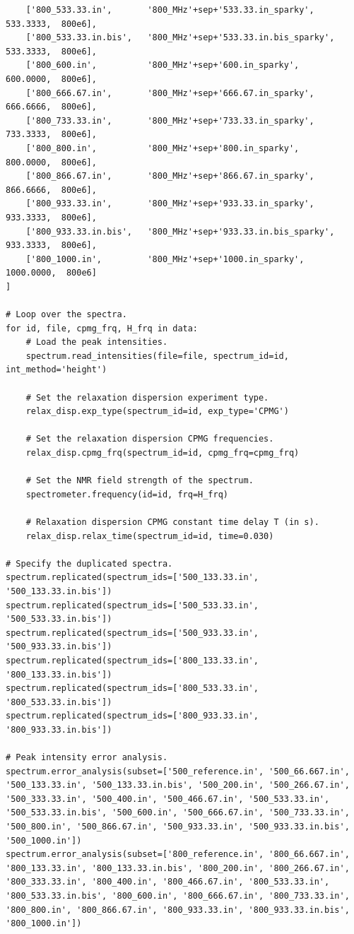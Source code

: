 \begin{lstlisting}
    ['800_533.33.in',       '800_MHz'+sep+'533.33.in_sparky',          533.3333,  800e6],
    ['800_533.33.in.bis',   '800_MHz'+sep+'533.33.in.bis_sparky',      533.3333,  800e6],
    ['800_600.in',          '800_MHz'+sep+'600.in_sparky',             600.0000,  800e6],
    ['800_666.67.in',       '800_MHz'+sep+'666.67.in_sparky',          666.6666,  800e6],
    ['800_733.33.in',       '800_MHz'+sep+'733.33.in_sparky',          733.3333,  800e6],
    ['800_800.in',          '800_MHz'+sep+'800.in_sparky',             800.0000,  800e6],
    ['800_866.67.in',       '800_MHz'+sep+'866.67.in_sparky',          866.6666,  800e6],
    ['800_933.33.in',       '800_MHz'+sep+'933.33.in_sparky',          933.3333,  800e6],
    ['800_933.33.in.bis',   '800_MHz'+sep+'933.33.in.bis_sparky',      933.3333,  800e6],
    ['800_1000.in',         '800_MHz'+sep+'1000.in_sparky',           1000.0000,  800e6]
]

# Loop over the spectra.
for id, file, cpmg_frq, H_frq in data:
    # Load the peak intensities.
    spectrum.read_intensities(file=file, spectrum_id=id, int_method='height')

    # Set the relaxation dispersion experiment type.
    relax_disp.exp_type(spectrum_id=id, exp_type='CPMG')

    # Set the relaxation dispersion CPMG frequencies.
    relax_disp.cpmg_frq(spectrum_id=id, cpmg_frq=cpmg_frq)

    # Set the NMR field strength of the spectrum.
    spectrometer.frequency(id=id, frq=H_frq)

    # Relaxation dispersion CPMG constant time delay T (in s).
    relax_disp.relax_time(spectrum_id=id, time=0.030)

# Specify the duplicated spectra.
spectrum.replicated(spectrum_ids=['500_133.33.in', '500_133.33.in.bis'])
spectrum.replicated(spectrum_ids=['500_533.33.in', '500_533.33.in.bis'])
spectrum.replicated(spectrum_ids=['500_933.33.in', '500_933.33.in.bis'])
spectrum.replicated(spectrum_ids=['800_133.33.in', '800_133.33.in.bis'])
spectrum.replicated(spectrum_ids=['800_533.33.in', '800_533.33.in.bis'])
spectrum.replicated(spectrum_ids=['800_933.33.in', '800_933.33.in.bis'])

# Peak intensity error analysis.
spectrum.error_analysis(subset=['500_reference.in', '500_66.667.in', '500_133.33.in', '500_133.33.in.bis', '500_200.in', '500_266.67.in', '500_333.33.in', '500_400.in', '500_466.67.in', '500_533.33.in', '500_533.33.in.bis', '500_600.in', '500_666.67.in', '500_733.33.in', '500_800.in', '500_866.67.in', '500_933.33.in', '500_933.33.in.bis', '500_1000.in'])
spectrum.error_analysis(subset=['800_reference.in', '800_66.667.in', '800_133.33.in', '800_133.33.in.bis', '800_200.in', '800_266.67.in', '800_333.33.in', '800_400.in', '800_466.67.in', '800_533.33.in', '800_533.33.in.bis', '800_600.in', '800_666.67.in', '800_733.33.in', '800_800.in', '800_866.67.in', '800_933.33.in', '800_933.33.in.bis', '800_1000.in'])


\end{lstlisting}
